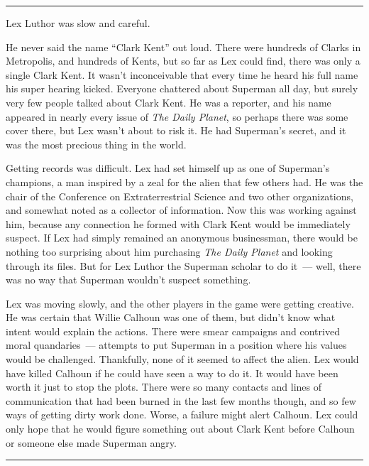 \documentclass[ebook,12pt]{memoir}
\begin{document}
\begin{center}\rule{0.5\linewidth}{0.5pt}\end{center}

Lex Luthor was slow and careful.

He never said the name ``Clark Kent'' out loud. There were hundreds of
Clarks in Metropolis, and hundreds of Kents, but so far as Lex could
find, there was only a single Clark Kent. It wasn't inconceivable that
every time he heard his full name his super hearing kicked. Everyone
chattered about Superman all day, but surely very few people talked
about Clark Kent. He was a reporter, and his name appeared in nearly
every issue of \emph{The Daily Planet}, so perhaps there was some cover
there, but Lex wasn't about to risk it. He had Superman's secret, and it
was the most precious thing in the world.

Getting records was difficult. Lex had set himself up as one of
Superman's champions, a man inspired by a zeal for the alien that few
others had. He was the chair of the Conference on Extraterrestrial
Science and two other organizations, and somewhat noted as a collector
of information. Now this was working against him, because any connection
he formed with Clark Kent would be immediately suspect. If Lex had
simply remained an anonymous businessman, there would be nothing too
surprising about him purchasing \emph{The Daily Planet} and looking
through its files. But for Lex Luthor the Superman scholar to do it~---
well, there was no way that Superman wouldn't suspect something.

Lex was moving slowly, and the other players in the game were getting
creative. He was certain that Willie Calhoun was one of them, but didn't
know what intent would explain the actions. There were smear campaigns
and contrived moral quandaries~--- attempts to put Superman in a
position where his values would be challenged. Thankfully, none of it
seemed to affect the alien. Lex would have killed Calhoun if he could
have seen a way to do it. It would have been worth it just to stop the
plots. There were so many contacts and lines of communication that had
been burned in the last few months though, and so few ways of getting
dirty work done. Worse, a failure might alert Calhoun. Lex could only
hope that he would figure something out about Clark Kent before Calhoun
or someone else made Superman angry.

\begin{center}\rule{0.5\linewidth}{0.5pt}\end{center}
\end{document}
